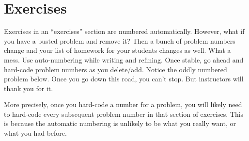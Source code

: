 \documentclass[10pt,]{article}
\theoremstyle{plain}
\theoremstyle{definition}
\theoremstyle{definition}
\theoremstyle{definition}
\theoremstyle{definition}
\theoremstyle{definition}
\theoremstyle{definition}
\numberwithin{equation}{section}
\begin{document}
\section[{Exercises}]{Exercises}\label{exercises}
\hypertarget{p-504}{}%
Exercises in an ``exercises'' section are numbered automatically.  However, what if you have a busted problem and remove it?  Then a bunch of problem numbers change and your list of homework for your students changes as well.  What a mess.  Use auto-numbering while writing and refining.  Once stable, go ahead and hard-code problem numbers as you delete/add.  Notice the oddly numbered problem below.  Once you go down this road, you can't stop.  But instructors will thank you for it.%
\par
\hypertarget{p-505}{}%
More precisely, once you hard-code a number for a problem, you will likely need to hard-code every subsequent problem number in that section of exercises.  This is because the automatic numbering is unlikely to be what you really want, or what you had before.%
\end{document}
